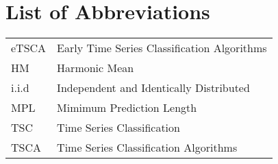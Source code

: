\section*{List of Abbreviations}


\begin{table}[h!]
\begin{tabular}{ll}
eTSCA   & Early Time Series Classification Algorithms\\
HM   & Harmonic Mean\\
i.i.d   & Independent and Identically Distributed\\
MPL   & Mimimum Prediction Length\\
TSC   & Time Series Classification\\
TSCA   & Time Series Classification Algorithms
\end{tabular}
\end{table}

\null\newpage
